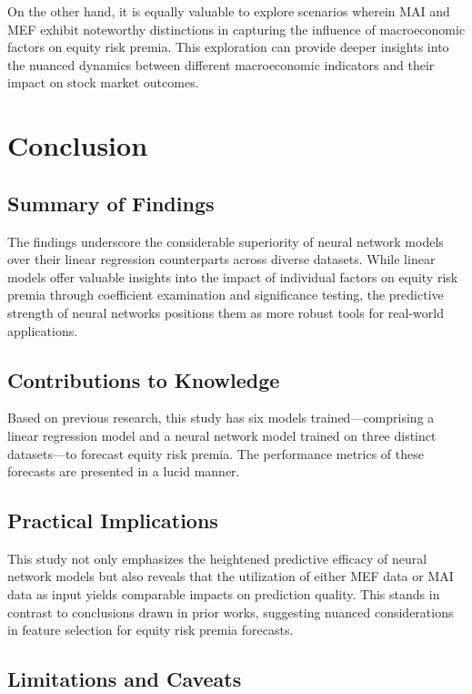 \documentclass{article}
\begin{document}
\noindent On the other hand, it is equally valuable to explore scenarios wherein MAI and MEF exhibit noteworthy distinctions in capturing the influence of macroeconomic factors on equity risk premia. This exploration can provide deeper insights into the nuanced dynamics between different macroeconomic indicators and their impact on stock market outcomes.

\newpage

\section{Conclusion}

\subsection{Summary of Findings}

The findings underscore the considerable superiority of neural network models over their linear regression counterparts across diverse datasets. While linear models offer valuable insights into the impact of individual factors on equity risk premia through coefficient examination and significance testing, the predictive strength of neural networks positions them as more robust tools for real-world applications.

\subsection{Contributions to Knowledge}

Based on previous research,  this study has six models trained—comprising a linear regression model and a neural network model trained on three distinct datasets—to forecast equity risk premia. The performance metrics of these forecasts are presented in a lucid manner.

\subsection{Practical Implications}

This study not only emphasizes the heightened predictive efficacy of neural network models but also reveals that the utilization of either MEF data or MAI data as input yields comparable impacts on prediction quality. This stands in contrast to conclusions drawn in prior works, suggesting nuanced considerations in feature selection for equity risk premia forecasts.

\subsection{Limitations and Caveats}
\end{document}
